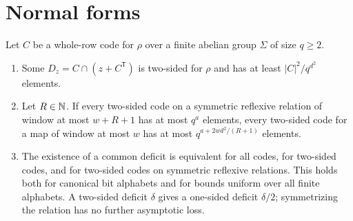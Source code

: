 \section{Normal forms}\label{sec:normal}

\begin{theorem}\label{thm:N}
Let $C$ be a whole-row code for $\rho$ over a finite abelian group $\Sigma$ of size $q\ge2$.
\begin{enumerate}[label=(\alph*),leftmargin=2em]
\item Some $D_z=C\cap(z+C^{\mathsf T})$ is two-sided for $\rho$ and has at least $|C|^2/q^{d^2}$ elements.
\item Let $R\in\mathbb{N}$. If every two-sided code on a symmetric reflexive relation of window at most $w+R+1$ has at most
$q^a$ elements, every two-sided code for a map of window at most $w$ has at most $q^{a+2wd^2/(R+1)}$ elements.
\item The existence of a common deficit is equivalent for all codes, for two-sided codes, and for two-sided codes
on symmetric reflexive relations. This holds both for canonical bit alphabets and for bounds uniform over all finite
alphabets. A two-sided deficit $\delta$ gives a one-sided deficit $\delta/2$; symmetrizing the relation has no further
asymptotic loss.
\end{enumerate}
\end{theorem}
